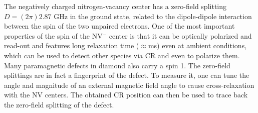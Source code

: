 \documentclass[9pt,twocolumn,twoside]{revtex4-1}
\begin{document}
The negatively charged nitrogen-vacancy center has a zero-field splitting $D=(2\pi) 2.87$ GHz in the ground state, related to the dipole-dipole interaction between the spin of the two unpaired electrons. One of the most important properties of the spin of the NV$^-$ center is that it can be optically polarized and read-out and features long relaxation time ($\approx $ms) even at ambient conditions, which can be used to detect other species via CR and even to polarize them. 
Many paramagnetic defects in diamond also carry a spin 1.
The zero-field splittings are in fact a fingerprint of the defect. To measure it, one can tune the angle and magnitude of an external magnetic field angle to cause cross-relaxation with the NV centers. The obtained CR position can then be used to trace back the zero-field splitting of the defect.
\end{document}
